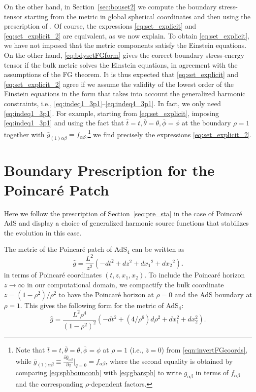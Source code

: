 \documentclass[a4paper,11pt]{article}
\numberwithin{equation}{section}
\begin{document}
On the other hand, in Section~\ref{sec:bouset2} we compute the boundary stress-tensor starting from the metric in global spherical coordinates and then using the prescription of \cite{Balasubramanian:1999re}. Of course, the expressions \eqref{eq:set_explicit} and \eqref{eq:set_explicit_2} are equivalent, as we now explain. To obtain \eqref{eq:set_explicit}, we have not imposed that the metric components satisfy the Einstein equations. On the other hand, \eqref{eq:bdysetFGform} gives the correct boundary stress-energy tensor if the bulk metric solves the Einstein equations, in agreement with the assumptions of the FG theorem. It is thus expected that \eqref{eq:set_explicit} and \eqref{eq:set_explicit_2} agree if we assume the validity of the lowest order of the Einstein equations in the form that takes into account the generalized harmonic constraints, i.e., \eqref{eq:indeq1_3p1}--\eqref{eq:indeq4_3p1}.
In fact, we only need \eqref{eq:indeq1_3p1}. For example, starting from \eqref{eq:set_explicit}, imposing \eqref{eq:indeq1_3p1} and using the fact that $\bar{t}=t,\bar{\theta}=\theta,\bar{\phi}=\phi$ at the boundary $\rho=1$ together with $\bar{g}_{(1)\alpha\beta}=f_{\alpha\beta}$,\footnote{Note that $\bar{t}=t,\bar{\theta}=\theta,\bar{\phi}=\phi$ at $\rho=1$ (i.e., $\bar{z}=0$) from \eqref{eqn:invertFGcoords}, while $\bar{g}_{(1)\alpha\beta}\equiv\frac{\partial \bar{g}_{\alpha\beta}}{\partial q}\bigr|_{q=0}=f_{\alpha\beta}$, where the second equality is obtained by comparing \eqref{eq:sphbounconh} with \eqref{eq:gbarsph} to write $\bar{g}_{\alpha\beta}$ in terms of $f_{\alpha\beta}$ and the corresponding $\rho$-dependent factors.} we find precisely the expressions \eqref{eq:set_explicit_2}.


\section{Boundary Prescription for the Poincar\'e Patch}\label{sec:poincare}

Here we follow the prescription of Section~\ref{sec:pre_sta} in the case of Poincar\'e AdS and display a choice of generalized harmonic source functions that stabilizes the evolution in this case.

The metric of the Poincar\'e patch of AdS$_4$ can be written  as
\begin{equation}
\label{eq:AdSpoincare}
\hat{g} = \frac{L^2}{z^2} \left( -dt^2 + dz^2 + dx_1{}^2 + dx_2{}^2  \right).
\end{equation}
in terms of Poincar\'e coordinates $(t,z,x_1,x_2)$. To include the Poincar\'e horizon $z\rightarrow \infty$ in our computational domain, we compactify the bulk coordinate $z=(1-\rho^2)/\rho^2$ to have the Poincar\'e horizon at $\rho=0$ and the AdS boundary at $\rho=1$. This gives the following form for the metric of AdS$_4$:
\begin{equation}
\hat{g} = \frac{L^2 \rho^4}{(1-\rho^2)^2} \left( -dt^2 + (4/\rho^6)d\rho^2 + dx_1^2 + dx_2^2  \right).
\end{equation}
\end{document}
